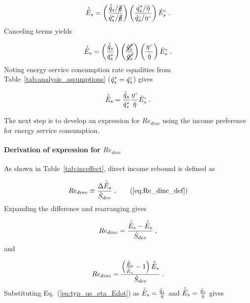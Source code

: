\begin{equation}
  \hat{\dot{E}}_s = \left( \frac{\hat{\dot{q}}_s / \cancel{\tilde{\eta}}}{{\dot{q}}^*_s / \cancel{\tilde{\eta}}} \right)
                \left( \frac{{\dot{q}}^*_s / \tilde{\eta}}{{}{\dot{q}}^{\scriptscriptstyle \circ}_s / {}{\eta}^{\scriptscriptstyle \circ}} \right)
                {}{\dot{E}}^{\scriptscriptstyle \circ}_s \; .
\end{equation}
%
Canceling terms yields

\begin{equation}
  \hat{\dot{E}}_s = \left( \frac{\hat{\dot{q}}_s}{{\dot{q}}^*_s} \right)
                \left( \frac{\cancel{{\dot{q}}^*_s}}{\cancel{{}{\dot{q}}^{\scriptscriptstyle \circ}_s}} \right)
                \left( \frac{{}{\eta}^{\scriptscriptstyle \circ}}{\tilde{\eta}}  \right)
                {}{\dot{E}}^{\scriptscriptstyle \circ}_s \; .
\end{equation}
%
Noting energy service consumption rate equalities from Table~\ref{tab:analysis_assumptions}
(${\dot{q}}^*_s = {}{\dot{q}}^{\scriptscriptstyle \circ}_s$) gives

\begin{equation} \label{eq:E_dot_s_hat}
  \hat{\dot{E}}_s = \frac{\hat{\dot{q}}_s}{{\dot{q}}^*_s}
                \frac{{}{\eta}^{\scriptscriptstyle \circ}}{\tilde{\eta}}
                {}{\dot{E}}^{\scriptscriptstyle \circ}_s \; .
\end{equation}

The next step is to develop an expression for $Re_{dinc}$
using the income preference for energy service consumption.


\paragraph{Derivation of expression for $Re_{dinc}$}
\label{sec:Re_dinc}

As shown in Table~\ref{tab:inceffect}, direct income rebound is defined as

\begin{equation}
  Re_{dinc} \equiv \frac{\Delta \rainc{E}_s}{\Sdot} \; . \tag{\ref{eq:Re_dinc_def}}
\end{equation}
%
Expanding the difference and rearranging gives

\begin{equation}
  Re_{dinc} = \frac{\bar{\dot{E}}_s - \hat{\dot{E}}_s}{\dot{S}_{dev}} \; ,
\end{equation}
%
and

\begin{equation}
  Re_{dinc} = \frac{\left( \frac{\bar{\dot{E}}_s}{\hat{\dot{E}}_s} - 1  \right) \hat{\dot{E}}_s}{\dot{S}_{dev}} \; .
\end{equation}
%
Substituting Eq.~(\ref{eq:typ_qs_eta_Edot}) as
$\bar{\dot{E}}_s = \frac{\bar{\dot{q}}_s}{\tilde{\eta}}$ and
$\hat{\dot{E}}_s = \frac{\hat{\dot{q}}_s}{\tilde{\eta}}$ gives

